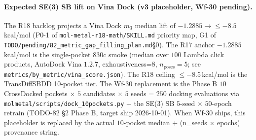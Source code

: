 \paragraph{Expected SE(3) SB lift on Vina Dock (v3 placeholder,
Wf-30 pending).}
The R18 backlog projects a Vina Dock $m_3$ median lift of
$-1.2885 \to \leq -8.5$\,kcal/mol (\textsc{P0-1} of
\texttt{mol-metal-r18-math/SKILL.md} priority map, G1 of
\texttt{TODO/pending/82\_metric\_gap\_filling\_plan.md}\S0).  The
R17 anchor $-1.2885$\,kcal/mol \MEASURED{} is the single-pocket
$830$c smoke (median over $100$ Lambda click products, AutoDock
Vina $1.2.7$, exhaustiveness=$8$, $n_{\text{poses}}=5$; see
\texttt{metrics/by\_metric/vina\_score.json}).  The R18 ceiling
$\leq -8.5$\,kcal/mol \PROJECTED{} is the TransDiffSBDD
10-pocket tier.  The Wf-30  replacement is
the Phase B $10$ CrossDocked pockets $\times$ $5$ candidates
$\times$ $5$ seeds = $250$ docking evaluations via
\texttt{molmetal/scripts/dock\_10pockets.py} + the SE(3) SB
$5$-seed $\times$ $50$-epoch retrain (TODO-82 \S2 Phase B,
target ship 2026-10-01).  When Wf-30 ships, this placeholder is
replaced by the actual $10$-pocket median + (n\_seeds $\times$
epochs) provenance string.